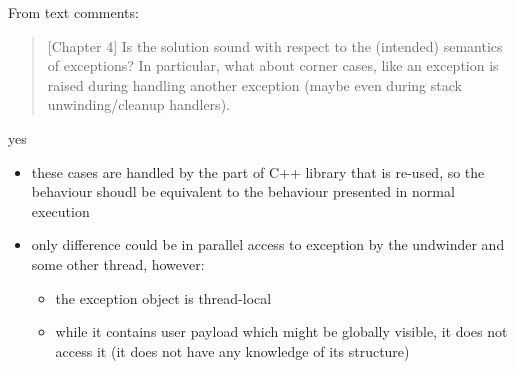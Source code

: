 \documentclass[aspectratio=169, fi]{paradise-slide}
\newcommand{\rquote}[1]{\begin{quote}#1\end{quote}\bigskip\setlength{\leftmargini}{1em}}
\begin{document}
\begin{frame}{\qtitle}
  From text comments:
  \rquote{[Chapter 4] Is the solution sound with respect to the (intended) semantics of exceptions? In
    particular, what about corner cases, like an exception is raised during handling another
    exception (maybe even during stack unwinding/cleanup handlers).}

  yes
  \begin{itemize}
    \item these cases are handled by the part of C++ library that is re-used, so the behaviour
      shoudl be equivalent to the behaviour presented in normal execution
    \item only difference could be in parallel access to exception by the undwinder and some other
      thread, however:
      \begin{itemize}
        \item the exception object is thread-local
        \item while it contains user payload which might be globally visible, it does not access it
          (it does not have any knowledge of its structure)
      \end{itemize}
  \end{itemize}
\end{frame}
\end{document}

